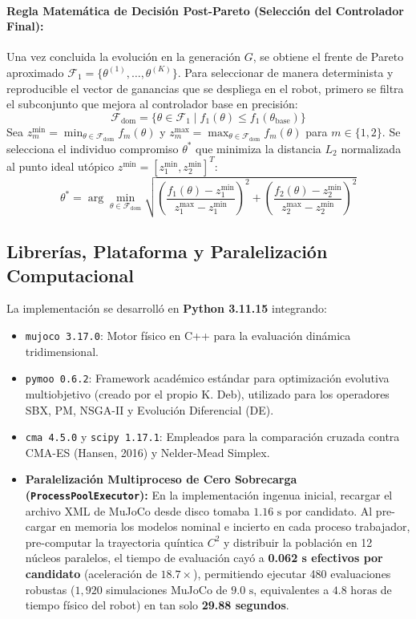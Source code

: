 \documentclass[11pt,a4paper]{article}
\begin{document}
\paragraph{Regla Matemática de Decisión Post-Pareto (Selección del Controlador Final):}
Una vez concluida la evolución en la generación $G$, se obtiene el frente de Pareto aproximado $\mathcal{F}_1 = \{\theta^{(1)}, \dots, \theta^{(K)}\}$. Para seleccionar de manera determinista y reproducible el vector de ganancias que se despliega en el robot, primero se filtra el subconjunto que mejora al controlador base en precisión:
\begin{equation}
    \mathcal{F}_{\text{dom}} = \big\{ \theta \in \mathcal{F}_1 \;\big|\; f_1(\theta) \le f_1(\theta_{\text{base}}) \big\}
\end{equation}
Sea $z_m^{\min} = \min_{\theta \in \mathcal{F}_{\text{dom}}} f_m(\theta)$ y $z_m^{\max} = \max_{\theta \in \mathcal{F}_{\text{dom}}} f_m(\theta)$ para $m \in \{1, 2\}$. Se selecciona el individuo compromiso $\theta^*$ que minimiza la distancia $L_2$ normalizada al punto ideal utópico $z^{\min} = [z_1^{\min}, z_2^{\min}]^T$:
\begin{equation}
    \theta^* = \arg\min_{\theta \in \mathcal{F}_{\text{dom}}} \sqrt{ \left( \frac{f_1(\theta) - z_1^{\min}}{z_1^{\max} - z_1^{\min}} \right)^2 + \left( \frac{f_2(\theta) - z_2^{\min}}{z_2^{\max} - z_2^{\min}} \right)^2 }
    \label{eq:compromiso}
\end{equation}

\subsection{Librerías, Plataforma y Paralelización Computacional}
La implementación se desarrolló en \textbf{Python 3.11.15} integrando:
\begin{itemize}
    \item \texttt{mujoco 3.17.0}: Motor físico en C++ para la evaluación dinámica tridimensional.
    \item \texttt{pymoo 0.6.2}: Framework académico estándar para optimización evolutiva multiobjetivo (creado por el propio K. Deb), utilizado para los operadores SBX, PM, NSGA-II y Evolución Diferencial (DE).
    \item \texttt{cma 4.5.0} y \texttt{scipy 1.17.1}: Empleados para la comparación cruzada contra CMA-ES (Hansen, 2016) y Nelder-Mead Simplex.
    \item \textbf{Paralelización Multiproceso de Cero Sobrecarga (\texttt{ProcessPoolExecutor}):} En la implementación ingenua inicial, recargar el archivo XML de MuJoCo desde disco tomaba $1.16\text{ s}$ por candidato. Al pre-cargar en memoria los modelos nominal e incierto en cada proceso trabajador, pre-computar la trayectoria quíntica $C^2$ y distribuir la población en 12 núcleos paralelos, el tiempo de evaluación cayó a \textbf{0.062 s efectivos por candidato} (aceleración de $18.7\times$), permitiendo ejecutar 480 evaluaciones robustas ($1,920$ simulaciones MuJoCo de $9.0\text{ s}$, equivalentes a $4.8\text{ horas}$ de tiempo físico del robot) en tan solo \textbf{29.88 segundos}.
\end{itemize}
\end{document}
